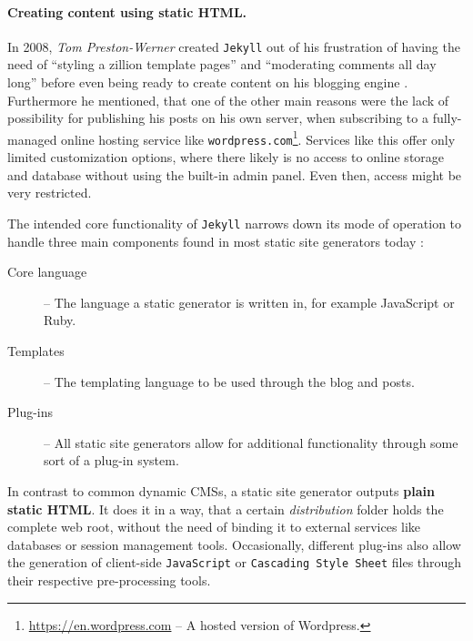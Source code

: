 \paragraph{Creating content using static HTML.}
\label{par:creatingcontent}
In 2008, \emph{Tom Preston-Werner} created \texttt{Jekyll} out of his frustration of having the need of ``styling a zillion template pages'' and ``moderating comments all day long'' before even being ready to create content on his blogging engine \cite[]{PrestonWerner2008jekyll}. Furthermore he mentioned, that one of the other main reasons were the lack of possibility for publishing his posts on his own server, when subscribing to a fully-managed online hosting service like \texttt{wordpress.com}\footnote{\url{https://en.wordpress.com} -- A hosted version of Wordpress.}. Services like this offer only limited customization options, where there likely is no access to online storage and database without using the built-in admin panel. Even then, access might be very restricted.

The intended core functionality of \texttt{Jekyll} narrows down its mode of operation to handle three main components found in most static site generators today \cite[24]{dhillon2016}:

\begin{description}
  \item [Core language] -- The language a static generator is written in, for example JavaScript or Ruby.
  \item [Templates] -- The templating language to be used through the blog and posts.
  \item [Plug-ins] -- All static site generators allow for additional functionality through some
sort of a plug-in system.
\end{description}

In contrast to common dynamic CMSs, a static site generator outputs \textbf{plain static HTML}. It does it in a way, that a certain \emph{distribution} folder holds the complete web root, without the need of binding it to external services like databases or session management tools. Occasionally, different plug-ins also allow the generation of client-side \texttt{JavaScript} or \texttt{Cascading Style Sheet} files through their respective pre-processing tools.




